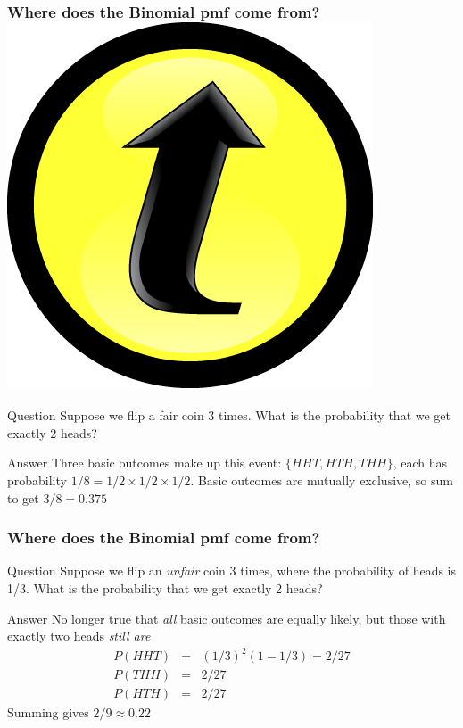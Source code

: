 \documentclass[handout]{beamer}
\begin{document}
\begin{frame}
\frametitle{Where does the Binomial pmf come from? \includegraphics[scale = 0.05]{./images/clicker} }
\begin{block}{Question}
Suppose we flip a fair coin 3 times. What is the probability that we get exactly 2 heads?
\end{block}

\pause

\begin{block}{Answer}
Three basic outcomes make up this event: $\{HHT, HTH, THH\}$, each has probability $1/8 = 1/2 \times 1/2 \times 1/2$. Basic outcomes are mutually exclusive, so sum to get \alert{$3/8 = 0.375$}
\end{block}

\end{frame}
\begin{frame}
\frametitle{Where does the Binomial pmf come from?}
\begin{block}{Question}
Suppose we flip an \emph{unfair} coin 3 times, where the probability of heads is 1/3. What is the probability that we get exactly 2 heads?
\end{block}



\begin{block}{Answer}
  No longer true that \emph{all} basic outcomes are equally likely, but those with exactly two heads \emph{\alert{still are}} 
	\begin{eqnarray*}
	 P(HHT) &=&  (1/3)^2 (1 - 1/3) =  2/27\\ 
	 P(THH) &=&2/27\\ 
	 P(HTH) &=&2/27 
	\end{eqnarray*}
	Summing gives \alert{$2/9 \approx 0.22$}
\end{block}
\end{frame}
\end{document}
